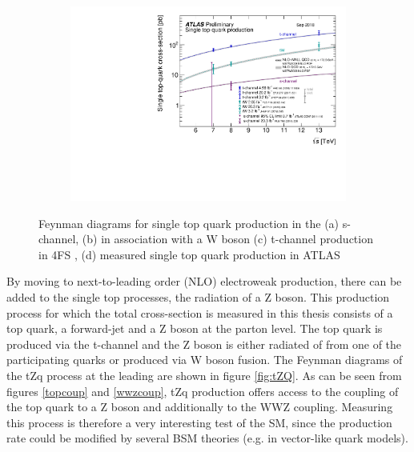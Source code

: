 \begin{figure}[h!]
\begin{subfigure}[b]{0.33\linewidth}
  \caption{}
  \end{subfigure}%
  \newline
  \centering
  \begin{subfigure}[b]{0.4\linewidth}
    \includegraphics[width=\linewidth]{ubonn-thesis/Chapters/Chapters_02/Figure/singletop.pdf} 
  \caption{}
  \label{ATLAS:singletop}
  \end{subfigure}%
  \caption{Feynman diagrams for single top quark production in the (a) s-channel, (b) in association with a W boson (c) t-channel production in 4FS , (d) measured single top quark production in ATLAS \cite{andrea}}
  \label{fig:singletopproduction}
  \end{figure}

By moving to next-to-leading order (NLO) electroweak production, there can be added to the single top processes, the radiation of a Z boson. This production process for which the total cross-section is measured in this thesis consists of a top quark, a forward-jet and a Z boson at the parton level. The top quark is produced via the t-channel and the Z boson is either radiated of from one of the participating quarks or produced via W boson fusion. The Feynman diagrams of the tZq process at the leading are shown in figure \ref{fig:tZQ}. As can be seen from figures \ref{topcoup} and \ref{wwzcoup}, tZq production offers access to the coupling of the top quark to a Z boson and additionally to the WWZ coupling. Measuring this process is therefore a very interesting test of the SM, since the production rate could be modified by several BSM theories (e.g. in vector-like quark models). 

